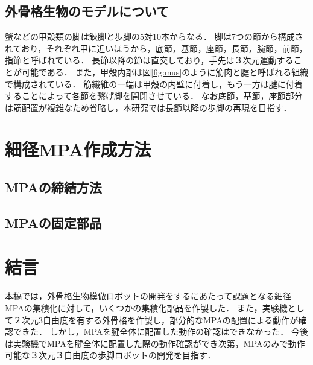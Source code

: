 \documentclass{jarticle}
\begin{document}
\vspace*{-1mm}
\subsection{外骨格生物のモデルについて}

蟹などの甲殻類の脚は鋏脚と歩脚の5対10本からなる．
脚は7つの節から構成されており，それぞれ甲に近いほうから，底節，基節，座節，長節，腕節，前節，指節と呼ばれている\cite{crab}．
長節以降の節は直交しており，手先は３次元運動することが可能である．
また，甲殻内部は図\ref{fig:mus}のように筋肉と腱と呼ばれる組織で構成されている．
筋繊維の一端は甲殻の内壁に付着し，もう一方は腱に付着することによって各節を繋げ脚を開閉させている．
なお底節，基節，座節部分は筋配置が複雑なため省略し，本研究では長節以降の歩脚の再現を目指す．

\vspace*{-2mm}
\section{細径MPA作成方法}

\vspace*{-1mm}
\subsection{MPAの締結方法}


\vspace*{-1mm}
\subsection{MPAの固定部品}

\vspace*{-2mm}
\section{結言}
本稿では，外骨格生物模倣ロボットの開発をするにあたって課題となる細径MPAの集積化に対して，いくつかの集積化部品を作製した．
また，実験機として２次元3自由度を有する外骨格を作製し，部分的なMPAの配置による動作が確認できた．
しかし，MPAを腱全体に配置した動作の確認はできなかった．
今後は実験機でMPAを腱全体に配置した際の動作確認ができ次第，MPAのみで動作可能な３次元３自由度の歩脚ロボットの開発を目指す．
\end{document}
